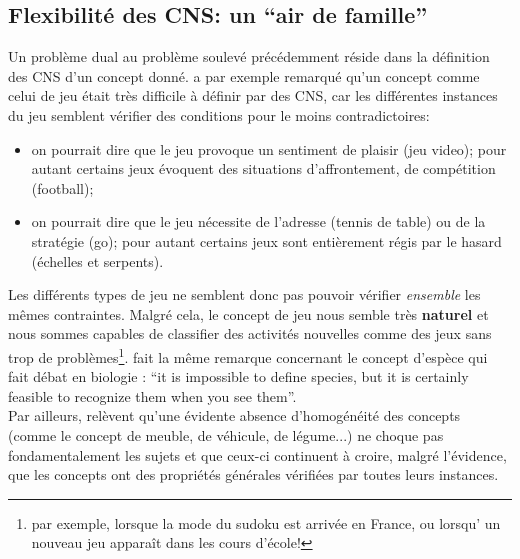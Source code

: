 \documentclass[french]{article}
\begin{document}
			\subsection{Flexibilité des CNS: un ``air de famille''}
				Un problème dual au problème soulevé précédemment réside dans la définition des CNS d'un concept donné. \cite{wittgenstein1953} a par exemple remarqué qu'un concept comme celui de jeu était très difficile à définir par des CNS, car les différentes instances du jeu semblent vérifier des conditions pour le moins contradictoires:
				\begin{itemize}
					\item on pourrait dire que le jeu provoque un sentiment de plaisir (jeu video); pour autant certains jeux évoquent des situations d'affrontement, de compétition (football);
					\item on pourrait dire que le jeu nécessite de l'adresse (tennis de table) ou de la stratégie (go); pour autant certains jeux sont entièrement régis par le hasard (échelles et serpents).
				\end{itemize}
				Les différents types de jeu ne semblent donc pas pouvoir vérifier \textit{ensemble} les mêmes contraintes. Malgré cela, le concept de jeu nous semble très \textbf{naturel} et nous sommes capables de classifier des activités nouvelles comme des jeux sans trop de problèmes\footnote{par exemple, lorsque la mode du sudoku est arrivée en France, ou lorsqu' un nouveau jeu apparaît dans les cours d'école!}. \cite{pigliucci2003} fait la même remarque concernant le concept d'espèce qui fait débat en biologie : ``it is impossible to define species, but it is certainly feasible to recognize them when you see them''.\\
				
				Par ailleurs, \cite{rosch1975} relèvent qu'une évidente absence d'homogénéité des concepts (comme le concept de meuble, de véhicule, de légume...) ne choque pas fondamentalement les sujets et que ceux-ci continuent à croire, malgré l'évidence, que les concepts ont des propriétés générales vérifiées par toutes leurs instances.\\
				
\end{document}
